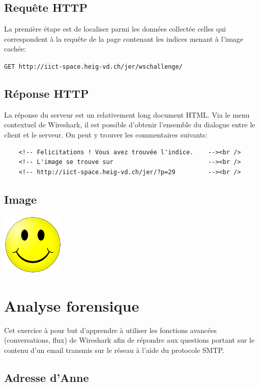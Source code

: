 \documentclass[11pt,a4paper]{article}
\begin{document}
\subsection{Requête HTTP}

La première étape est de localiser parmi les données collectée celles qui correspondent à la requête de la page contenant les indices menant à l'image cachée:

\texttt{GET http://iict-space.heig-vd.ch/jer/wschallenge/}

\subsection{Réponse HTTP}

La réponse du serveur est un relativement long document HTML. Via le menu contextuel de Wireshark, il est possible d'obtenir l'ensemble du dialogue entre le client et le serveur. On peut y trouver les commentaires suivants:

\begin{verbatim}
	<!-- Felicitations ! Vous avez trouvée l'indice.    --><br />
	<!-- L'image se trouve sur                          --><br />
	<!-- http://iict-space.heig-vd.ch/jer/?p=29         --><br />
\end{verbatim}

\subsection{Image}

\begin{center}
\includegraphics[width=3cm]{img_cachee}
\end{center}

\section{Analyse forensique}

Cet exercice à pour but d'apprendre à utiliser les fonctions avancées (conversations, flux) de Wireshark afin de répondre aux questions portant sur le contenu d'un email transmis sur le réseau à l'aide du protocole SMTP.

\subsection{Adresse d'Anne}
\end{document}
